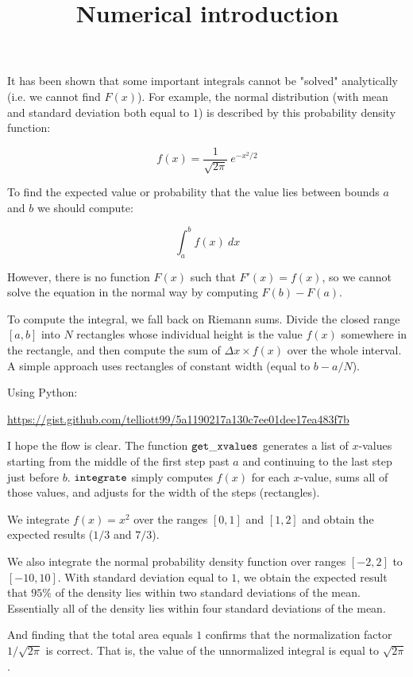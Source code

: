 \documentclass[11pt, oneside]{article}
\title{Numerical introduction}
\date{}
\begin{document}
\maketitle
\Large
It has been shown that some important integrals cannot be "solved" analytically (i.e.  we cannot find $F(x)$).  For example, the normal distribution (with mean and standard deviation both equal to $1$) is described by this probability density function:

\[ f(x) = \frac{1}{\sqrt{2 \pi}} \ e^{-x^2/2} \]

To find the expected value or probability that the value lies between bounds $a$ and $b$ we should compute:

\[  \int_a^b f(x) \ dx \]

However, there is no function $F(x)$ such that $F'(x) = f(x)$, so we cannot solve the equation in the normal way by computing $F(b) - F(a)$.

To compute the integral, we fall back on Riemann sums.  Divide the closed range $[a,b]$ into $N$ rectangles whose individual height is the value $f(x)$ somewhere in the rectangle, and then compute the sum of $\Delta x \times f(x)$ over the whole interval.  A simple approach uses rectangles of constant width (equal to $b-a/N$).

Using Python:

\url{https://gist.github.com/telliott99/5a1190217a130c7ee01dee17ea483f7b}

I hope the flow is clear.  The function $\tt{get\_xvalues}$ generates a list of $x$-values starting from the middle of the first step past $a$ and continuing to the last step just before $b$.  $\tt{integrate}$ simply computes $f(x)$ for each $x$-value, sums all of those values, and adjusts for the width of the steps (rectangles).

We integrate $f(x) = x^2$ over the ranges $[0,1]$ and $[1,2]$ and obtain the expected results ($1/3$ and $7/3$).

We also integrate the normal probability density function over ranges $[-2,2]$ to $[-10,10]$.  With standard deviation equal to $1$, we obtain the expected result that $95 \%$ of the density lies within two standard deviations of the mean.  Essentially all of the density lies within four standard deviations of the mean.

And finding that the total area equals $1$ confirms that the normalization factor $1/\sqrt{2 \pi}$ is correct.  That is, the value of the unnormalized integral is equal to $\sqrt{2 \pi}$.
\end{document}
